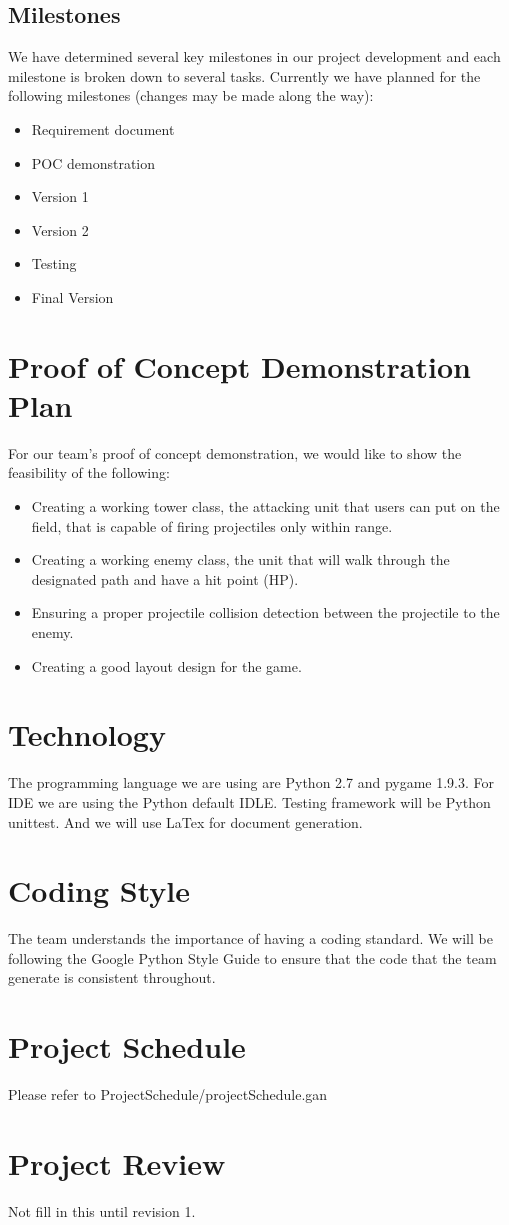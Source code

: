\documentclass{article}
\begin{document}
\subsection{Milestones}
We have determined several key milestones in our project development and each milestone is broken down to several tasks. Currently we have planned for the following milestones (changes may be made along the way):
\begin{itemize}
    \item Requirement document
    \item POC demonstration
    \item Version 1
    \item Version 2
    \item Testing
    \item Final Version
\end{itemize}

\section{Proof of Concept Demonstration Plan}
For our team’s proof of concept demonstration, we would like to show the feasibility of the following:
\begin{itemize}
    \item Creating a working tower class, the attacking unit that users can put on the field,  that is capable of firing projectiles only within range.
    \item Creating a working enemy class, the unit that will walk through the designated path and have a hit point (HP).
    \item Ensuring a proper projectile collision detection between the projectile to the enemy.
    \item Creating a good layout design for the game.
\end{itemize}

\section{Technology}
The programming language we are using are Python 2.7 and pygame 1.9.3. For IDE we are using the Python default IDLE. Testing framework will be Python unittest. And we will use LaTex for document generation.

\section{Coding Style}
The team understands the importance of having a coding standard. We will be following the Google Python Style Guide to ensure that the code that the team generate is consistent throughout.

\section{Project Schedule}
Please refer to ProjectSchedule/projectSchedule.gan

\section{Project Review}
Not fill in this until revision 1.
\end{document}
